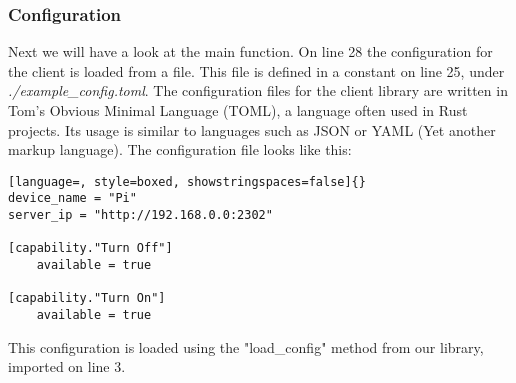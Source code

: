 \subsubsection{Configuration}
Next we will have a look at the main function. On line 28 the configuration for the client is loaded from a file. This file is defined in a constant on line 25, under \textit{./example\_config.toml}. The configuration files for the client library are written in Tom's Obvious Minimal Language (TOML), a language often used in Rust projects. Its usage is similar to languages such as JSON or YAML (Yet another markup language). The configuration file looks like this:

\begin{lstlisting}[language=, style=boxed, showstringspaces=false]{}
device_name = "Pi"
server_ip = "http://192.168.0.0:2302"

[capability."Turn Off"]
    available = true

[capability."Turn On"]
    available = true
\end{lstlisting}
This configuration is loaded using the "load\_config" method from our library, imported on line 3. 
